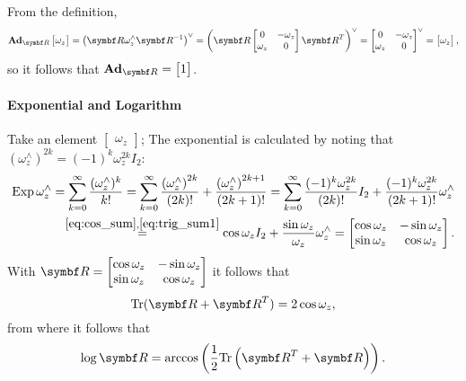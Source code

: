 From the definition,
\begin{equation}
  \bAd_{\bR} \begin{bmatrix} \omega_{z} \end{bmatrix}
  = \left( \bR \omega_{z}^{\wedge} \bR^{-1} \right)^{\vee} = \left(\bR \begin{bmatrix} 0 & -\omega_{z} \\ \omega_{z} & 0 \end{bmatrix} \bR^T \right)^{\vee} = \begin{bmatrix} 0 & -\omega_{z} \\ \omega_{z} & 0 \end{bmatrix}^{\vee} = \begin{bmatrix} \omega_{z} \end{bmatrix},
\end{equation}
so it follows that $\bAd_{\bR} = \begin{bmatrix} 1 \end{bmatrix}$.

\paragraph{Exponential and Logarithm}

Take an element $\begin{bmatrix}\omega_z\end{bmatrix}$; The exponential is calculated by noting that $(\omega_z^\wedge)^{2k} = (-1)^{k} \omega_z^{2k} I_2$:
\begin{equation}
  \begin{aligned}
    \operatorname{Exp} {\omega_z^\wedge} = \sum_{k = 0}^{\infty} \frac{(\omega_z^\wedge)^k}{k!} = \sum_{k = 0}^{\infty} \frac{\left(\omega_{z}^{\wedge}\right)^{2k}}{(2k)!} + \frac{\left(\omega_{z}^{\wedge}\right)^{2k + 1}}{(2k + 1)!} = \sum_{k = 0}^{\infty} \frac{(-1)^{k} \omega_{z}^{2k}}{(2k)!} I_{2} + \frac{(-1)^{k} \omega_{z}^{2k}}{(2k + 1)!} \omega_{z}^{\wedge} \\
    \overset{\eqref{eq:cos_sum}, \eqref{eq:trig_sum1}}= \cos \omega_z I_2 + \frac{\sin \omega_{z}}{\omega_{z}} \omega_z^\wedge = \begin{bmatrix} \cos \omega_z & - \sin \omega_z \\ \sin \omega_z & \cos \omega_z \end{bmatrix}.
  \end{aligned}
\end{equation}
With $\bR = \begin{bmatrix} \cos \omega_z & -\sin \omega_z \\ \sin \omega_z & \cos \omega_z \end{bmatrix}$ it follows that
\begin{equation}
  \tr (\bR + \bR^T) = 2 \cos \omega_z,
\end{equation}
from where it follows that
\begin{equation}
  \log \bR = \arccos \left( \frac{1}{2} \tr \left( \bR^T + \bR \right) \right).
\end{equation}

